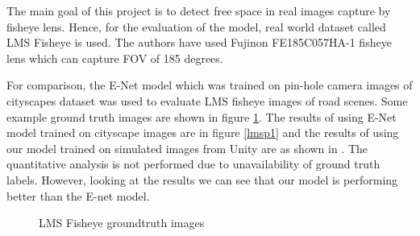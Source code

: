 \documentclass[a4paper, 12pt, oneside, BCOR1cm,toc=chapterentrywithdots]{scrbook}
\begin{document}
The main goal of this project is to detect free space in real images capture by fisheye lens. Hence, for the evaluation of the model, real world dataset called LMS Fisheye \cite{7471935} is used. The authors have used Fujinon FE185C057HA-1 fisheye lens which can capture FOV of 185 degrees.

For comparison, the E-Net \cite{Paszke2017ENetAD} model which was trained on pin-hole camera images of cityscapes dataset \cite{Cordts2016Cityscapes} was used to evaluate LMS fisheye \cite{7471935} images of road scenes. Some example ground truth images are shown in figure \ref{lmsgt}. The results of using E-Net model trained on cityscape images are in figure \ref{lmsp1} and the results of using our model trained on simulated images from Unity are as shown in \label{lmsp2}. The quantitative analysis is not performed due to unavailability of ground truth labels. However, looking at the results we can see that our model is performing better than the E-net model.

\newpage

\begin{figure}[h] 
\caption{LMS Fisheye groundtruth images} \label{lmsgt}
\end{figure}
\end{document}
